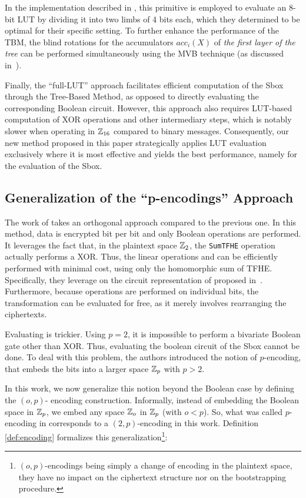 In the implementation described in \cite{DBLP:conf/wahc/TramaCBS23}, this primitive is employed to evaluate an 8-bit LUT by dividing it into two limbs of 4 bits each, which they determined to be optimal for their specific setting. 
%
To further enhance the performance of the TBM, the blind rotations for the accumulators $acc_i(X)$ of \emph{the first layer of the tree} can be performed simultaneously using the MVB technique (as discussed in~\cite{TCHES:GuiBorAra21}). 

Finally, the ``full-LUT'' approach facilitates efficient computation of the Sbox through the Tree-Based Method, as opposed to directly evaluating the corresponding Boolean circuit. However, this approach also requires LUT-based computation of XOR operations and other intermediary steps, which is notably slower when operating in $\mathbb{Z}_{16}$ compared to binary messages. Consequently, our new method \hippo{} proposed in this paper strategically applies LUT evaluation exclusively where it is most effective and yields the best performance, namely for the evaluation of the Sbox.

\subsection{Generalization of the ``p-encodings'' Approach}

The work of \cite{TCHES:BonPoiRiv24} takes an orthogonal approach compared to the previous one. In this method, data is encrypted bit per bit and only Boolean operations are performed. It leverages the fact that, in the plaintext space $\mathbb{Z}_2$, the \texttt{SumTFHE} operation actually performs a XOR. Thus, the linear operations \MixColumns and \AddRoundKey can be efficiently performed with minimal cost, using only the homomorphic sum of TFHE. Specifically, they leverage on the circuit representation of \MixColumns proposed in~\cite{EPRINT:Maximov19}.
%
Furthermore, because operations are performed on individual bits, the \ShiftRows transformation can be evaluated for free, as it merely involves rearranging the ciphertexts.

Evaluating \SubBytes is trickier. Using $p=2$, it is impossible to perform a bivariate Boolean gate other than XOR. Thus, evaluating the boolean circuit of the Sbox cannot be done. To deal with this problem, the authors introduced the notion of $p$-encoding, that embeds the bits into a larger space $\mathbb{Z}_p$ with $p > 2$.  

In this work, we now generalize this notion beyond the Boolean case by defining the $(o, p)$- encoding construction. Informally, instead of embedding the Boolean space in $\mathbb{Z}_p$, we embed any space $\mathbb{Z}_o$ in $\mathbb{Z}_p$ (with $o < p$). So, what was called $p$-encoding in \cite{TCHES:BonPoiRiv24} corresponds to a $(2, p)$-encoding in this work.
%
Definition \ref{def:encoding} formalizes this generalization\footnote{
$(o, p)$-encodings being simply a change of encoding in the plaintext space, they have no impact on the ciphertext structure nor on the bootstrapping procedure.}: 

